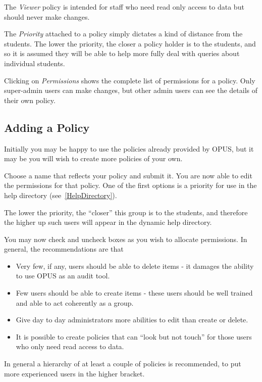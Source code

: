 \documentclass[12 pt]{book}
\begin{document}
The \emph{Viewer} policy is intended for staff who need read only access to
data but should never make changes.

The \emph{Priority} attached to a policy simply dictates a kind of distance
from the students. The lower the priority, the closer a policy holder is to
the students, and so it is assumed they will be able to help more fully deal
with queries about individual students.

Clicking on \emph{Permissions} shows the complete list of permissions for a
policy. Only super-admin users can make changes, but other admin users can
see the details of their own policy.

\subsection{Adding a Policy}

Initially you may be happy to use the policies already provided by OPUS, but
it may be you will wish to create more policies of your own.

Choose a name that reflects your policy and submit it. You are now able to
edit the permissions for that policy. One of the first options is a priority
for use in the help directory (see~\ref{HelpDirectory}).

The lower the priority, the 
``closer'' this group is to the students, and therefore the
higher up such users will appear in the dynamic help directory.

You may now check and uncheck boxes as you wish to allocate permissions. 
In general, the recommendations are that
\begin{itemize}
  \item Very few, if any, users should be able to delete items - it damages
    the ability to use OPUS as an audit tool.
  \item Few users should be able to create items - these users should be well
    trained and able to act coherently as a group.
  \item Give day to day administrators more abilities to edit than create or delete.
  \item It is possible to create policies that can ``look but not touch'' for those
    users who only need read access to data.
\end{itemize}

In general a hierarchy of at least a couple of policies is recommended, to put
more experienced users in the higher bracket.
\end{document}
